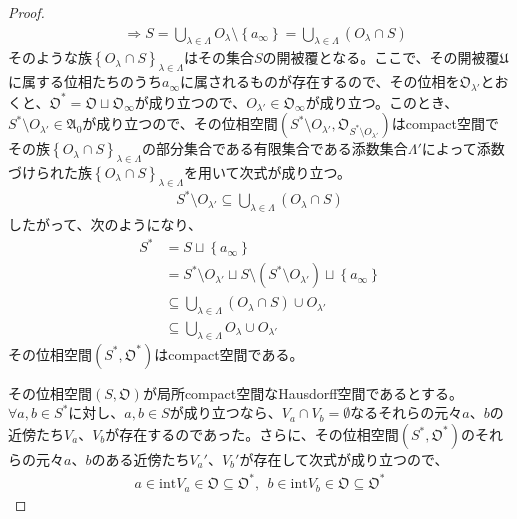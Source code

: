 \documentclass[dvipdfmx]{jsarticle}
\begin{document}
\begin{proof}
\begin{align*}
&\Rightarrow S = \bigcup_{\lambda \in \varLambda} O_{\lambda} \setminus \left\{ a_{\infty} \right\} = \bigcup_{\lambda \in \varLambda} \left( O_{\lambda} \cap S \right)
\end{align*}
そのような族$\left\{ O_{\lambda} \cap S \right\}_{\lambda \in \varLambda}$はその集合$S$の開被覆となる。ここで、その開被覆$\mathfrak{U}$に属する位相たちのうち$a_{\infty}$に属されるものが存在するので、その位相を$\mathfrak{O}_{\lambda'}$とおくと、$\mathfrak{O}^{*} = \mathfrak{O \sqcup}\mathfrak{O}_{\infty}$が成り立つので、$O_{\lambda'} \in \mathfrak{O}_{\infty}$が成り立つ。このとき、$S^{*} \setminus O_{\lambda'} \in \mathfrak{A}_{0}$が成り立つので、その位相空間$\left( S^{*} \setminus O_{\lambda'},\mathfrak{O}_{S^{*} \setminus O_{\lambda'}} \right)$はcompact空間でその族$\left\{ O_{\lambda} \cap S \right\}_{\lambda \in \varLambda}$の部分集合である有限集合である添数集合$\varLambda'$によって添数づけられた族$\left\{ O_{\lambda} \cap S \right\}_{\lambda \in \varLambda }$を用いて次式が成り立つ。
\begin{align*}
S^{*} \setminus O_{\lambda'} \subseteq \bigcup_{\lambda \in \varLambda } \left( O_{\lambda} \cap S \right)
\end{align*}
したがって、次のようになり、
\begin{align*}
S^{*} &= S \sqcup \left\{ a_{\infty} \right\}\\
&= S^{*} \setminus O_{\lambda'} \sqcup S \setminus \left( S^{*} \setminus O_{\lambda'} \right) \sqcup \left\{ a_{\infty} \right\}\\
&\subseteq \bigcup_{\lambda \in \varLambda } \left( O_{\lambda} \cap S \right) \cup O_{\lambda'}\\
&\subseteq \bigcup_{\lambda \in \varLambda } O_{\lambda} \cup O_{\lambda'}
\end{align*}
その位相空間$\left( S^{*},\mathfrak{O}^{*} \right)$はcompact空間である。\par
その位相空間$\left( S,\mathfrak{O} \right)$が局所compact空間なHausdorff空間であるとする。$\forall a,b \in S^{*}$に対し、$a,b \in S$が成り立つなら、$V_{a} \cap V_{b} = \emptyset$なるそれらの元々$a$、$b$の近傍たち$V_{a}$、$V_{b}$が存在するのであった。さらに、その位相空間$\left( S^{*},\mathfrak{O}^{*} \right)$のそれらの元々$a$、$b$のある近傍たち$V_{a}'$、$V_{b}'$が存在して次式が成り立つので、
\begin{align*}
a \in {\mathrm{int}}V_{a}\in \mathfrak{O \subseteq}\mathfrak{O}^{*},\ \ b \in {\mathrm{int}}V_{b}\in \mathfrak{O \subseteq}\mathfrak{O}^{*}
\end{align*}

\end{proof}
\end{document}
